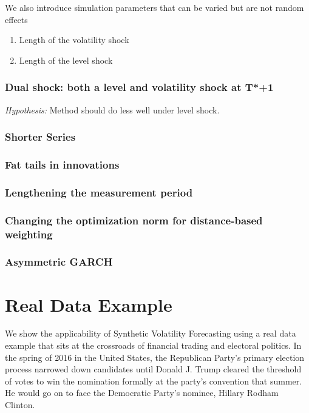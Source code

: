 \documentclass[11pt]{article}
\theoremstyle{definition}
\begin{document}
We also introduce simulation parameters that can be varied but are not random effects

\begin{enumerate}
  \item Length of the volatility shock
  \item Length of the level shock
\end{enumerate}


\subsubsection{Dual shock: both a level and volatility shock at T*+1}
\textit{Hypothesis:} Method should do less well under level shock.


\subsubsection{Shorter Series}

\subsubsection{Fat tails in innovations}

\subsubsection{Lengthening the measurement period}

\subsubsection{Changing the optimization norm for distance-based weighting}

\subsubsection{Asymmetric GARCH}

\section{Real Data Example}

We show the applicability of Synthetic Volatility Forecasting using a real data example that sits at the crossroads of financial trading and electoral politics.  In the spring of 2016 in the United States, the Republican Party's primary election process narrowed down candidates until Donald J. Trump cleared the threshold of votes to win the nomination formally at the party's convention that summer.  He would go on to face the Democratic Party's nominee, Hillary Rodham Clinton.   
\end{document}
